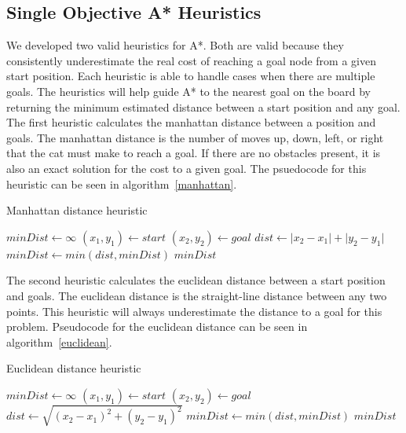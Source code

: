 \documentclass[12pt, conference, compsocconf]{IEEEtran}
\begin{document}
\subsection{Single Objective A* Heuristics}
We developed two valid heuristics for A*.  Both are valid because they
consistently underestimate the real cost of reaching a goal node from a given
start position.  Each heuristic is able to handle cases when there are multiple
goals.  The heuristics will help guide A* to the nearest goal on the board by
returning the minimum estimated distance between a start position and any goal.
The first heuristic calculates the manhattan distance between a position and
goals.  The manhattan distance is the number of moves up, down, left, or right
that the cat must make to reach a goal.  If there are no obstacles present, it
is also an exact solution for the cost to a given goal.  The psuedocode for
this heuristic can be seen in algorithm~\ref{manhattan}.

\begin{algorithm}
    \caption{Manhattan distance heuristic}
    \label{manhattan}
    \begin{algorithmic}[1]
        \State $minDist\gets \infty$
        \State $(x_1, y_1)\gets start$
        \State $(x_2, y_2)\gets goal$
        \State $dist\gets \lvert x_2-x_1\rvert + \lvert y_2-y_1\rvert$
        \State $minDist\gets min(dist, minDist)$
        \EndFor
        \Return $minDist$
        \EndProcedure
    \end{algorithmic}
\end{algorithm}

The second heuristic calculates the euclidean distance between a start position
and goals.  The euclidean distance is the straight-line distance between any
two points.  This heuristic will always underestimate the distance to a
goal for this problem.  Pseudocode for the euclidean distance can be seen in
algorithm~\ref{euclidean}.

\begin{algorithm}
    \caption{Euclidean distance heuristic}
    \label{euclidean}
    \begin{algorithmic}[1]
        \State $minDist\gets \infty$
        \State $(x_1, y_1)\gets start$
        \State $(x_2, y_2)\gets goal$
        \State $dist\gets \sqrt{(x_2-x_1)^2+(y_2-y_1)^2}$
        \State $minDist\gets min(dist, minDist)$
        \EndFor
        \Return $minDist$
        \EndProcedure
    \end{algorithmic}
\end{algorithm}
\end{document}
